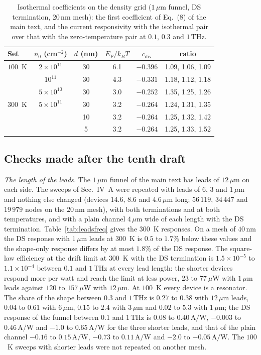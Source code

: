 \documentclass[aps,prapplied,onecolumn,superscriptaddress,floatfix]{revtex4-2}
\newcommand{\um}{\,\mu\mathrm{m}}
\newcommand{\nm}{\,\mathrm{nm}}
\newcommand{\THz}{\,\mathrm{THz}}
\newcommand{\AW}{\,\mathrm{A/W}}
\begin{document}
\begin{table}[ht]
\caption{\label{tab:ftgrid}Isothermal coefficients on the density grid
($1\um$ funnel, DS termination, $20\nm$ mesh): the first coefficient of
Eq.~(8) of the main text, and the current responsivity with the
isothermal pair over that with the zero-temperature pair at $0.1$, $0.3$
and $1\THz$.}
\begin{ruledtabular}
\begin{tabular}{lccccc}
Set & $n_{0}$ (cm$^{-2}$) & $d$ (nm) & $E_{F}/k_{B}T$ & $c_{\mathrm{div}}$ & ratio \\
\hline
$100$~K & $2\times10^{11}$ & 30 & 6.1 & $-0.396$ & 1.09, 1.06, 1.09 \\
 & $10^{11}$ & 30 & 4.3 & $-0.331$ & 1.18, 1.12, 1.18 \\
 & $5\times10^{10}$ & 30 & 3.0 & $-0.252$ & 1.35, 1.25, 1.26 \\
$300$~K & $5\times10^{11}$ & 30 & 3.2 & $-0.264$ & 1.24, 1.31, 1.35 \\
 & & 10 & 3.2 & $-0.264$ & 1.25, 1.32, 1.42 \\
 & & 5 & 3.2 & $-0.264$ & 1.25, 1.33, 1.52 \\
\end{tabular}
\end{ruledtabular}
\end{table}

\subsection*{Checks made after the tenth draft}

\emph{The length of the leads.} The $1\um$ funnel of the main text has
leads of $12\um$ on each side. The sweeps of Sec.~IV~A were repeated
with leads of $6$, $3$ and $1\um$ and nothing else changed (devices
$14.6$, $8.6$ and $4.6\um$ long; $56\,119$, $34\,447$ and $19\,979$
nodes on the $20\nm$ mesh), with both terminations and at both
temperatures, and with a plain channel $4\um$ wide of each length with
the DS termination. Table~\ref{tab:leadsfreq} gives the $300$~K
responses. On a mesh of $40\nm$ the DS response with $1\um$ leads at
$300$~K is $0.5$ to $1.7\%$ below these values and the shape-only
response differs by at most $1.8\%$ of the DS response. The square-law
efficiency at the drift limit at $300$~K with the DS termination is
$1.5\times10^{-5}$ to $1.1\times10^{-4}$ between $0.1$ and $1\THz$ at
every lead length: the shorter devices respond more per watt and reach
the limit at less power, $23$ to $77\ \mu$W with $1\um$ leads against
$120$ to $157\ \mu$W with $12\um$. At $100$~K every device is a
resonator. The share of the shape between $0.3$ and $1\THz$ is $0.27$ to
$0.38$ with $12\um$ leads, $0.04$ to $0.61$ with $6\um$, $0.15$ to $2.4$
with $3\um$ and $0.02$ to $5.3$ with $1\um$; the DS response of the
funnel between $0.1$ and $1\THz$ is $0.08$ to $0.40\AW$, $-0.003$ to
$0.46\AW$ and $-1.0$ to $0.65\AW$ for the three shorter leads, and that
of the plain channel $-0.16$ to $0.15\AW$, $-0.73$ to $0.11\AW$ and
$-2.0$ to $-0.05\AW$. The $100$~K sweeps with shorter leads were not
repeated on another mesh.
\end{document}
